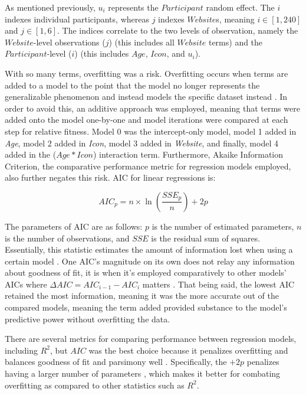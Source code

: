 \documentclass[12pt,twoside]{reedthesis}
\begin{document}
    As mentioned previously, $u_i$ represents the $Participant$ random effect. The $i$ indexes individual participants, whereas $j$ indexes $Website$s, meaning $i\in[1,240]$ and $j\in [1,6]$. The indices correlate to the two levels of observation, namely the $Website$-level observations ($j$) (this includes all $Website$ terms) and the $Participant$-level ($i$) (this includes $Age$, $Icon$, and $u_i$).

    With so many terms, overfitting was a risk. Overfitting occurs when terms are added to a model to the point that the model no longer represents the generalizable phenomenon and instead models the specific dataset instead \cite{perraillon}. In order to avoid this, an additive approach was employed, meaning that terms were added onto the model one-by-one and model iterations were compared at each step for relative fitness. Model 0 was the intercept-only model, model 1 added in \textit{Age}, model 2 added in \textit{Icon}, model 3 added in \textit{Website}, and finally, model 4 added in the ($Age*Icon$) interaction term. Furthermore, Akaike Information Criterion, the comparative performance metric for regression models employed, also further negates this risk. AIC for linear regressions is:

    $$AIC_p = n\times \ln\left(\frac{SSE_p}{n}\right)+2p$$

    The parameters of AIC are as follows: $p$ is the number of estimated parameters, $n$ is the number of observations, and $SSE$ is the residual sum of squares. Essentially, this statistic estimates the amount of information lost when using a certain model \cite{aic}. One AIC's magnitude on its own does not relay any information about goodness of fit, it is when it's employed comparatively to other models' AICs where $\Delta AIC = AIC_{i-1}-AIC_{i}$ matters \cite{burnham_information_2002}. That being said, the lowest AIC retained the most information, meaning it was the more accurate out of the compared models, meaning the term added provided substance to the model's predictive power without overfitting the data.

    There are several metrics for comparing performance between regression models, including $R^2$, but $AIC$ was the best choice because it penalizes overfitting and balances goodness of fit and parsimony well \cite{perraillon}. Specifically, the $+2p$ penalizes having a larger number of parameters \cite{perraillon}, which makes it better for combating overfitting as compared to other statistics such as $R^2$.
    
\end{document}
